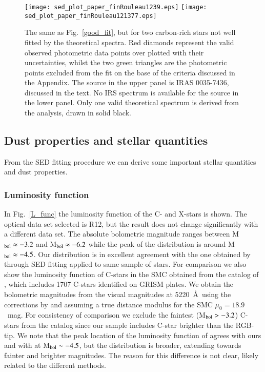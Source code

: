 \documentclass[useAMS,usenatbib]{mn2e/mn2e}
\begin{document}
\begin{figure}
\texttt{[image: sed\_plot\_paper\_finRouleau1239.eps]}
\texttt{[image: sed\_plot\_paper\_finRouleau121377.eps]}
        \caption{The same as Fig.~\ref{good_fit}, but for two carbon-rich stars not well fitted by the theoretical spectra. Red diamonds represent the valid observed photometric data points over plotted with their uncertainties, whilst the two green triangles are the photometric points excluded from the fit on the base of the criteria discussed in the Appendix. The source in the upper panel is IRAS 0035-7436, discussed in the text. No IRS spectrum is available for the source in the lower panel. Only one valid theoretical spectrum is derived from the analysis, drawn in solid black.}
\label{bad_fit}
\end{figure}
        
\subsection{Dust properties and stellar quantities}
From the SED fitting procedure we can derive some important stellar quantities and dust properties.
\subsubsection{Luminosity function}
In Fig.~\ref{L_func} the luminosity function of the C- and X-stars is shown. The optical data set selected is R12, but the result does not change significantly with a different data set.
The absolute bolometric magnitude ranges between M$_{\rm bol}\approx-3.2$ and M$_{\rm bol}\approx-6.2$ while the peak of the distribution is around M$_{\rm bol}\approx-4.5$.
Our distribution is in excellent agreement with the one
obtained by \citet{Srinivasan16} through SED fitting applied to same sample of stars. For comparison we also show the luminosity function of C-stars in the SMC obtained from the catalog of \citet{Rebeirot_etal93}, which includes 1707 C-stars identified on GRISM plates. We obtain the bolometric magnitudes from the visual magnitudes at 5220~\AA\ using the corrections by \citet{Westerlund_etal86} and assuming a true distance modulus for the SMC $\mu_0 = 18.9$~mag. For consistency of comparison we exclude the faintest (M$_{\rm bol} > -3.2$) C-stars from the  \citet{Rebeirot_etal93} catalog since our sample includes C-star brighter than the RGB-tip.
We note that the peak location of the luminosity function of \citet{Rebeirot_etal93} agrees with ours and with \citet{Srinivasan16} at  M$_{\rm bol} \sim -4.5$, but the distribution is broader, extending towards fainter and brighter magnitudes. The reason for this difference is not clear, likely related to the different methods.
\end{document}

